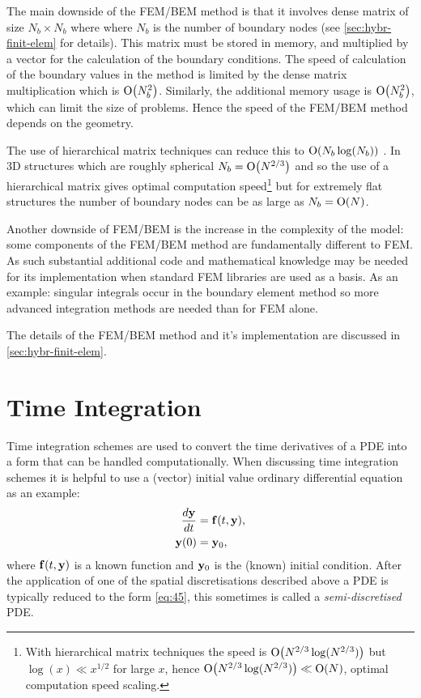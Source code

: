 The main downside of the FEM/BEM method is that it involves dense matrix of size $N_b \times N_b$ where where $N_b$ is the number of boundary nodes (see \cref{sec:hybr-finit-elem} for details).
This matrix must be stored in memory, and multiplied by a vector for the calculation of the boundary conditions.
The speed of calculation of the boundary values in the method is limited by the dense matrix multiplication which is $\text{O}{\left( N_b^2 \right)}$.
Similarly, the additional memory usage is $\text{O}{\left( N_b^2 \right)}$, which can limit the size of problems.
Hence the speed of the FEM/BEM method depends on the geometry.

The use of hierarchical matrix techniques can reduce this to $\text{O}{\left( N_b \log(N_b) \right)}$ \cite{Knittel2009}.
In 3D structures which are roughly spherical $N_b = \text{O}{\left( N^{2/3} \right)}$ and so the use of a hierarchical matrix gives optimal computation speed\footnote{With hierarchical matrix techniques the speed is $\text{O}{\left( N^{2/3}\log(N^{2/3}) \right)}$ but $\log(x) \ll x^{1/2}$ for large $x$, hence $\text{O}{\left( N^{2/3}\log(N^{2/3}) \right)} \ll \text{O}{\left( N \right)}$, \ie optimal computation speed scaling.} but for extremely flat structures the number of boundary nodes can be as large as $N_b = \text{O}{\left( N \right)}$.

Another downside of FEM/BEM is the increase in the complexity of the model: some components of the FEM/BEM method are fundamentally different to FEM.
As such substantial additional code and mathematical knowledge may be needed for its implementation when standard FEM libraries are used as a basis.
As an example: singular integrals occur in the boundary element method so more advanced integration methods are needed than for FEM alone.

The details of the FEM/BEM method and it's implementation are discussed in \cref{sec:hybr-finit-elem}.


\section{Time Integration}
\label{sec:time-discretisation}

Time integration schemes are used to convert the time derivatives of a PDE into a form that can be handled computationally. 
When discussing time integration schemes it is helpful to use a (vector) initial value ordinary differential equation as an example:
\begin{equation}
  \begin{aligned}
    \frac{d \mathbf{y}}{dt} &= {\mathbf{f}{\left( t, \mathbf{y} \right)}}, \\
    \mathbf{y}(0) &= \mathbf{y}_0,
    \label{eq:45}
  \end{aligned}
\end{equation}
where ${\mathbf{f}}(t,\mathbf{y})$ is a known function and $\mathbf{y}_0$ is the (known) initial condition.
After the application of one of the spatial discretisations described above a PDE is typically reduced to the form \cref{eq:45}, this sometimes is called a \emph{semi-discretised} PDE.

